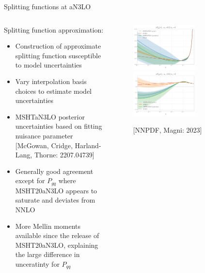 \documentclass[aspectratio=169, 8pt,t]{beamer}
\begin{document}
\begin{frame}{Splitting functions at aN3LO}
  \begin{columns}[T]
    \begin{column}{0.49\textwidth}
      Splitting function approximation:
      \begin{itemize}
        \item Construction of approximate splitting function susceptible to  model uncertainties
        \item Vary interpolation basis choices to estimate model uncertainties
        \item MSHTaN3LO posterior uncertainties based on fitting nuisance parameter {\color{gray}\small[McGowan, Cridge, Harland-Lang, Thorne: 2207.04739]}
        \item Generally good agreement except for $P_{gq}$ where MSHT20aN3LO appears to saturate and deviates from NNLO
        \item More Mellin moments available since the release of MSHT20aN3LO, explaining the large difference in unceratinty for $P_{qq}$
      \end{itemize}
    \end{column}
    \begin{column}{0.49\textwidth}
      \vspace*{-4em}
      \begin{figure}
        \includegraphics[width=0.65\textwidth]{figures/gamma_qq_msht_logx.pdf}\\
        \includegraphics[width=0.65\textwidth]{figures/gamma_gq_msht_logx.pdf}
        \caption*{\color{gray}\small [NNPDF, Magni: 2023]}
      \end{figure}
    \end{column}
  \end{columns}
\end{frame}
\end{document}
